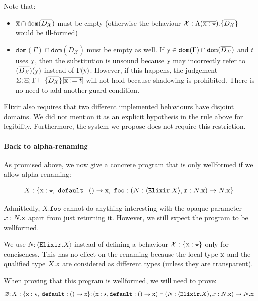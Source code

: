 \documentclass[12pt]{article}
\newcommand{\tx}{\text{\rm x}}
\newcommand{\ty}{\text{\rm y}}
\newcommand{\BX}{\ensuremath{\mathcal{X}}}
\newcommand{\emptyenv}{\varnothing}
\newcommand{\Gammatop}{\ensuremath{\Xi}}
\newcommand{\Gammabot}{\ensuremath{\Gamma}}
\newcommand{\dom}{\texttt{dom}}
\newcommand{\Elixir}{\texttt{Elixir}}
\begin{document}
Note that:
\begin{itemize}
    \item $\overline{\tx} \cap \dom(\overline{D_\BX})$ must be empty (otherwise the behaviour
          $\BX : \Lambda(\overline{\tx : \star}). \{ \overline{D_\BX} \}$ would be ill-formed)
    \item $\dom(\Gammabot) \cap \dom(\overline{D_\BX})$ must be empty as well. If $\ty \in \dom(\Gammabot) \cap \dom(\overline{D_\BX})$ and $t$ uses $\ty$, then the substitution
          is unsound because $\ty$ may incorrectly refer to $(\overline{D_\BX})(\ty)$ instead of $\Gammabot(\ty)$.
          However, if this happens, the judgement
          $\Sigma; \Gammatop; \Gammabot \vdash \{ \overline{D_\BX} \}[\overline{\tx := t}]$ will not hold because shadowing is prohibited.
          There is no need to add another guard condition.
\end{itemize}

Elixir also requires that two different implemented behaviours have disjoint domains.
We did not mention it as an explicit hypothesis in the rule above for legibility.
Furthermore, the system we propose does not require this restriction.

\paragraph{Back to alpha-renaming}

As promised above, we now give a concrete program that is only wellformed if
we allow alpha-renaming:

$$X : \{ \tx : \star,\; \texttt{default} : () \rightarrow \tx,\; \texttt{foo} : (N : \langle \Elixir.X \rangle, x : N.\tx) \rightarrow N.\tx \}$$

Admittedly, $X.\texttt{foo}$ cannot do anything interesting with the opaque
parameter $x : N.\tx$ apart from just returning it. However, we still expect the program to be wellformed.

We use $N : \langle \Elixir.X \rangle$ instead of defining a behaviour
$\BX : \{ \tx : \star \}$ only for conciseness.
This has no effect on the renaming because the local type $\tx$ and
the qualified type $X.\tx$ are considered as different types (unless they are
transparent).


When proving that this program is wellformed, we will need to prove:
$$\emptyenv; X : \{ \tx : \star,\; \texttt{default} : () \rightarrow \tx \}; \left(\tx : \star, \texttt{default} : () \rightarrow \tx \right) \vdash (N : \langle \Elixir.X \rangle, x : N.\tx) \rightarrow N.\tx$$
\end{document}
